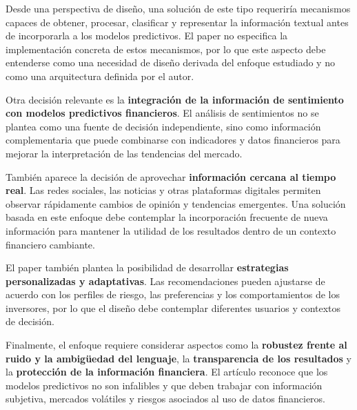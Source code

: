 \vspace{2mm}

Desde una perspectiva de diseño, una solución de este tipo requeriría mecanismos capaces de obtener, procesar, clasificar y representar la información textual antes de incorporarla a los modelos predictivos. El paper no especifica la implementación concreta de estos mecanismos, por lo que este aspecto debe entenderse como una necesidad de diseño derivada del enfoque estudiado y no como una arquitectura definida por el autor.

\vspace{2mm}

Otra decisión relevante es la \textbf{integración de la información de sentimiento con modelos predictivos financieros}. El análisis de sentimientos no se plantea como una fuente de decisión independiente, sino como información complementaria que puede combinarse con indicadores y datos financieros para mejorar la interpretación de las tendencias del mercado.

\vspace{2mm}

También aparece la decisión de aprovechar \textbf{información cercana al tiempo real}. Las redes sociales, las noticias y otras plataformas digitales permiten observar rápidamente cambios de opinión y tendencias emergentes. Una solución basada en este enfoque debe contemplar la incorporación frecuente de nueva información para mantener la utilidad de los resultados dentro de un contexto financiero cambiante.

\vspace{2mm}

El paper también plantea la posibilidad de desarrollar \textbf{estrategias personalizadas y adaptativas}. Las recomendaciones pueden ajustarse de acuerdo con los perfiles de riesgo, las preferencias y los comportamientos de los inversores, por lo que el diseño debe contemplar diferentes usuarios y contextos de decisión.

\vspace{2mm}

Finalmente, el enfoque requiere considerar aspectos como la \textbf{robustez frente al ruido y la ambigüedad del lenguaje}, la \textbf{transparencia de los resultados} y la \textbf{protección de la información financiera}. El artículo reconoce que los modelos predictivos no son infalibles y que deben trabajar con información subjetiva, mercados volátiles y riesgos asociados al uso de datos financieros.


